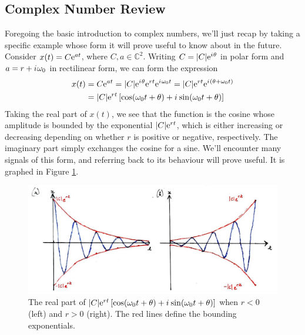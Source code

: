 \subsection{Complex Number Review}
%
Foregoing the basic introduction to complex numbers, we'll just recap by taking a specific
example whose form it will prove useful to know about in the future. Consider $x(t) = C\mathrm{e}^{at}$,
where $C,a\in \mathbb{C}^2$. Writing $C = |C|\mathrm{e}^{{i\mkern1mu}\theta}$ in
polar form and $a = r + {i\mkern1mu}\omega_0$ in rectilinear form, we can form the expression
%
\begin{align*}
  x(t) &= C\mathrm{e}^{at} = |C|\mathrm{e}^{{i\mkern1mu}\theta}\mathrm{e}^{rt}\mathrm{e}^{{i\mkern1mu}\omega_0 t} = |C|\mathrm{e}^{rt}\mathrm{e}^{{i\mkern1mu}(\theta + \omega_0 t)} \\
  &= |C|\mathrm{e}^{rt}\left[ \cos(\omega_0 t + \theta) + {i\mkern1mu}\sin(\omega_0 t + \theta) \right]
\end{align*}
%
Taking the real part of $x(t)$, we see that the function is the cosine whose amplitude is bounded by the
exponential $|C|\mathrm{e}^{rt}$, which is either increasing or decreasing depending on whether $r$ is positive
or negative, respectively. The imaginary part simply exchanges the cosine for a sine.
We'll encounter many signals of this form, and referring back to its behaviour
will prove useful. It is graphed in Figure \ref{fig::lecture_1_complex_numbers}.
%
\begin{figure}[!htb]
  \includegraphics[width=\textwidth]{images/lecture_1_complex_numbers.JPG}
  \caption{
    The real part of
    $|C|\mathrm{e}^{rt}\left[ \cos(\omega_0 t + \theta) + {i\mkern1mu}\sin(\omega_0 t + \theta) \right]$
    when $r < 0$ (left) and $r > 0$ (right). The red lines define the bounding exponentials.
  }
  \label{fig::lecture_1_complex_numbers}
\end{figure}

